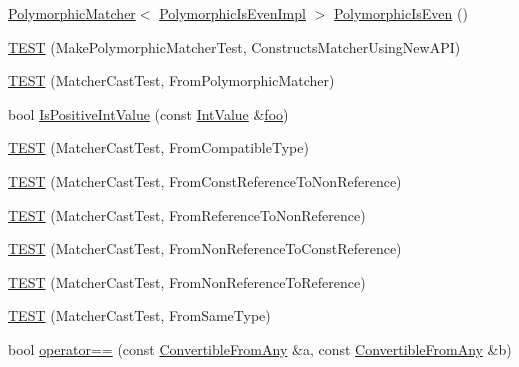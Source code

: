 \begin{DoxyCompactItemize}
\item 
\hyperlink{classtesting_1_1_polymorphic_matcher}{Polymorphic\+Matcher}$<$ \hyperlink{classtesting_1_1gmock__matchers__test_1_1_polymorphic_is_even_impl}{Polymorphic\+Is\+Even\+Impl} $>$ \hyperlink{namespacetesting_1_1gmock__matchers__test_a8a0035a0de2d219d89ff7070762ece72}{Polymorphic\+Is\+Even} ()
\item 
\hyperlink{namespacetesting_1_1gmock__matchers__test_a619d872aa86419c5093327f64c466df3}{T\+E\+ST} (Make\+Polymorphic\+Matcher\+Test, Constructs\+Matcher\+Using\+New\+A\+PI)
\item 
\hyperlink{namespacetesting_1_1gmock__matchers__test_afffaa6f2c436edb7c46e7a16ed2de825}{T\+E\+ST} (Matcher\+Cast\+Test, From\+Polymorphic\+Matcher)
\item 
bool \hyperlink{namespacetesting_1_1gmock__matchers__test_a68565741c989968637db5a9e10e55020}{Is\+Positive\+Int\+Value} (const \hyperlink{classtesting_1_1gmock__matchers__test_1_1_int_value}{Int\+Value} \&\hyperlink{namespacetesting_1_1gmock__matchers__test_a3536e68112ffbb1f76887cd15bb45c15}{foo})
\item 
\hyperlink{namespacetesting_1_1gmock__matchers__test_aa7a28536a6c59d56bbbbdb4fa5ba9e4d}{T\+E\+ST} (Matcher\+Cast\+Test, From\+Compatible\+Type)
\item 
\hyperlink{namespacetesting_1_1gmock__matchers__test_a9d25aac0defd9296bf207cacd342aff0}{T\+E\+ST} (Matcher\+Cast\+Test, From\+Const\+Reference\+To\+Non\+Reference)
\item 
\hyperlink{namespacetesting_1_1gmock__matchers__test_a4bb3955a1e0b603c0156c98a2dc49eea}{T\+E\+ST} (Matcher\+Cast\+Test, From\+Reference\+To\+Non\+Reference)
\item 
\hyperlink{namespacetesting_1_1gmock__matchers__test_a6fd48b8275f96d9d4ee840f0ec590fb1}{T\+E\+ST} (Matcher\+Cast\+Test, From\+Non\+Reference\+To\+Const\+Reference)
\item 
\hyperlink{namespacetesting_1_1gmock__matchers__test_ab8d3174b8f1ab799906938ed9984643b}{T\+E\+ST} (Matcher\+Cast\+Test, From\+Non\+Reference\+To\+Reference)
\item 
\hyperlink{namespacetesting_1_1gmock__matchers__test_a8f845dd5b1bcdc660926d67dce32b5d2}{T\+E\+ST} (Matcher\+Cast\+Test, From\+Same\+Type)
\item 
bool \hyperlink{namespacetesting_1_1gmock__matchers__test_af0b7ba716a9150ff6db37abda4b44fc8}{operator==} (const \hyperlink{structtesting_1_1gmock__matchers__test_1_1_convertible_from_any}{Convertible\+From\+Any} \&a, const \hyperlink{structtesting_1_1gmock__matchers__test_1_1_convertible_from_any}{Convertible\+From\+Any} \&b)

\end{DoxyCompactItemize}
